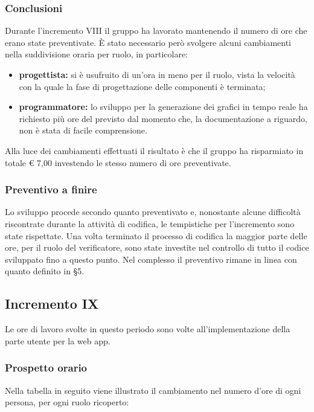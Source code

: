 		\subsubsection*{Conclusioni}
			Durante l'incremento VIII il gruppo ha lavorato mantenendo il numero di ore che erano state preventivate. È stato necessario però svolgere alcuni cambiamenti nella suddivisione oraria per ruolo, in particolare:
		\begin{itemize}
			\item \textbf{progettista:} si è usufruito di un'ora in meno per il ruolo, vista la velocità con la quale la fase di progettazione delle componenti è terminata;
			\item \textbf{programmatore:} lo sviluppo per la generazione dei grafici in tempo reale ha richiesto più ore del previsto dal momento che, la documentazione a riguardo, non è stata di facile comprensione. 
		\end{itemize}
			Alla luce dei cambiamenti effettuati il risultato è che il gruppo ha risparmiato in totale € 7,00 investendo le stesso numero di ore preventivate.
		
		\subsubsection{Preventivo a finire}
			Lo sviluppo procede secondo quanto preventivato e, nonostante alcune difficoltà riscontrate durante la attività di codifica, le tempistiche per l'incremento sono state rispettate. Una volta terminato il processo di codifica la maggior parte delle ore, per il ruolo del verificatore, sono state investite nel controllo di tutto il codice sviluppato fino a questo punto.
			\newline
			Nel complesso il preventivo rimane in linea con quanto definito in \S5.
		
		
		
		\subsection{Incremento IX}
			Le ore di lavoro svolte in questo periodo sono volte all'implementazione della parte utente per la web app.
		\subsubsection{Prospetto orario}
			Nella tabella in seguito viene illustrato il cambiamento nel numero d'ore di ogni persona, per ogni ruolo ricoperto:
		
